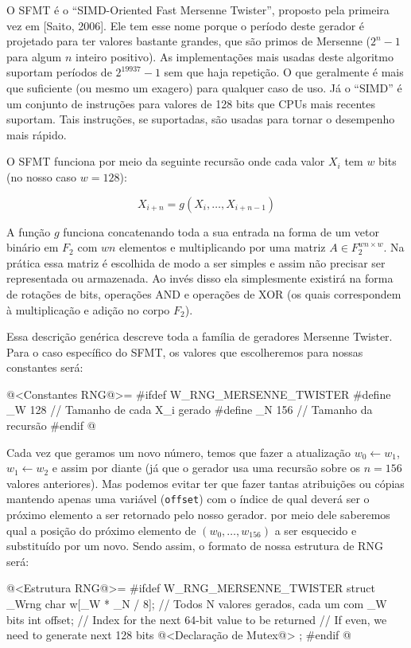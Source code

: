 
O SFMT é o ``SIMD-Oriented Fast Mersenne Twister'', proposto pela
primeira vez em [Saito, 2006]. Ele tem esse nome porque o período
deste gerador é projetado para ter valores bastante grandes, que são
primos de Mersenne ($2^n-1$ para algum $n$ inteiro positivo). As
implementações mais usadas deste algoritmo suportam períodos de
$2^{19937}-1$ sem que haja repetição. O que geralmente é mais que
suficiente (ou mesmo um exagero) para qualquer caso de uso. Já o
``SIMD'' é um conjunto de instruções para valores de 128 bits que CPUs
mais recentes suportam. Tais instruções, se suportadas, são usadas
para tornar o desempenho mais rápido.

O SFMT funciona por meio da seguinte recursão onde cada valor $X_i$
tem $w$ bits (no nosso caso $w=128$):

$$
X_{i+n}=g(X_i, \ldots, X_{i+n-1})
$$

A função $g$ funciona concatenando toda a sua entrada na forma de um
vetor binário em $F_2$ com $wn$ elementos e multiplicando por
uma matriz $A\in F_2^{wn\times w}$. Na prática essa matriz é
escolhida de modo a ser simples e assim não precisar ser representada
ou armazenada. Ao invés disso ela simplesmente existirá na forma de
rotações de bits, operações AND e operações de XOR (os quais
correspondem à multiplicação e adição no corpo $F_2$).

Essa descrição genérica descreve toda a família de geradores Mersenne
Twister. Para o caso específico do SFMT, os valores que escolheremos
para nossas constantes será:

\iniciocodigo
@<Constantes RNG@>=
#ifdef W_RNG_MERSENNE_TWISTER
#define _W 128 // Tamanho de cada X_i gerado
#define _N 156 // Tamanho da recursão
#endif
@
\fimcodigo

Cada vez que geramos um novo número, temos que fazer a atualização
$w_0 \leftarrow w_1$, $w_1 \leftarrow w_2$ e assim por diante (já que
o gerador usa uma recursão sobre os $n=156$ valores anteriores). Mas
podemos evitar ter que fazer tantas atribuições ou cópias mantendo
apenas uma variável (\texttt{offset}) com o índice de qual deverá ser
o próximo elemento a ser retornado pelo nosso gerador. por meio dele
saberemos qual a posição do próximo elemento de $(w_0, \ldots,
w_{156})$ a ser esquecido e substituído por um novo. Sendo assim, o
formato de nossa estrutura de RNG será:

\iniciocodigo
@<Estrutura RNG@>=
#ifdef W_RNG_MERSENNE_TWISTER
struct _Wrng{
  char w[_W * _N / 8]; // Todos N valores gerados, cada um com _W bits
  int offset;          // Index for the next 64-bit value to be returned
                       // If even, we need to generate next 128 bits
  @<Declaração de Mutex@>
};
#endif
@
\fimcodigo

